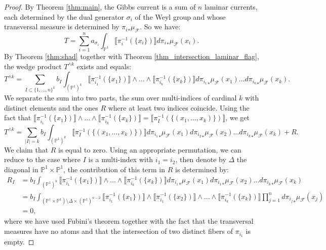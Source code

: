 \documentclass[12pt]{amsbook}%
\theoremstyle{definition}
\theoremstyle{remark}
\numberwithin{section}{chapter}
\numberwithin{subsection}{section}
\numberwithin{figure}{chapter}
\newcommand\intcur[1]{\llbracket #1 \rrbracket}
\def\bP{{\mathbb{P}}}
\def\cF{{\mathscr{F}}}
\begin{document}
{{\begin{proof}
By Theorem \ref{thm:main}, the Gibbs current is a sum of $n$ laminar currents, each determined by the dual generator $\sigma_i$ of the Weyl group and whose transversal measure is determined by ${\pi_i}_* \mu_{\cF}$. 
So we have: 
\begin{equation*}
T = \sum_{i=1}^n a_{\sigma_i} \int_{\bP^1} \intcur{ \pi_i^{-1} (\{x_i \})} d {\pi_{i}}_* \mu_{\cF}(x_i). 
\end{equation*} 
By Theorem \ref{thm:shad} together with Theorem \ref{thm_intersection_laminar_flag}, the wedge product $T^{\wedge k}$ exists and equals: 
\begin{equation*}
T^{\wedge k} = \sum_{I \subset \{1, \ldots,n \}^k} b_I \int_{(\bP^1)^k} \intcur{\pi_{i_1}^{-1}(\{x_1\})}\wedge \ldots \wedge \intcur{\pi_{i_k}^{-1}(\{x_k\})} d {\pi_{i_1}}_* \mu_{\cF}(x_1) \ldots d {\pi_{i_k}}_* \mu_{\cF}(x_k).  
\end{equation*} 
We separate the sum into two parts, the sum over multi-indices of cardinal $k$ with distinct elements and the ones $R$ where at least two indices coincide. Using the fact that $\intcur{\pi_{i_1}^{-1}(\{x_1\})}\wedge \ldots \wedge \intcur{\pi_{i_k}^{-1}(\{x_k\})} = \intcur{\pi_I^{-1}(\{(x_{1},\ldots, x_{k} ) \})}$, 
we get 
\begin{equation*}
T^{\wedge k} = \sum_{|I|=k} b_I \int_{(\bP^1)^k} \intcur{\pi_I^{-1}(\{(x_1,\ldots, x_k)\})} d {\pi_{i_1}}_*\mu_{\cF}(x_1) d{\pi_{i_2}}_*\mu_{\cF}(x_2) \ldots d {\pi_{i_k}}_*\mu_{\cF}(x_k) + R.
\end{equation*}
We claim that $R$ is equal to zero. Using an appropriate permutation, we can reduce to the case where $I$ is a multi-index with $i_1 = i_2$, then denote by $\Delta$ the diagonal in $\bP^1 \times \bP^1$, the contribution of this term in $R$ is determined by: 
\begin{align*}
R_I &= b_I \int_{(\bP^1)^k} \intcur{\pi_{i_1}^{-1}(\{x_1\})}\wedge \ldots \wedge \intcur{\pi_{i_k}^{-1}(\{x_k\})} d {\pi_{i_1}}_*\mu_{\cF}(x_1) d{\pi_{i_1}}_*\mu_{\cF}(x_2) \ldots d {\pi_{i_k}}_*\mu_{\cF}(x_k) \\ 
& = b_I \int_{(\bP^1 \times \bP^1) \setminus \Delta \times (\bP^1)^{n-2}} \intcur{\pi_{i_1}^{-1}(\{x_1\})}\wedge \intcur{\pi_{i_1}^{-1} (\{x_2\}) } \wedge \ldots \wedge \intcur{\pi_{i_k}^{-1}(\{x_k\})} \prod_{j=1}^n d {\pi_{i_j}}_*\mu_{\cF}(x_j) \\ 
& = 0,
\end{align*}
where we have used Fubini's theorem together with the fact that the transversal measures have no atoms and that the intersection of two distinct fibers of $\pi_{i_1}$ is empty.  
\end{proof}

}}
\end{document}
